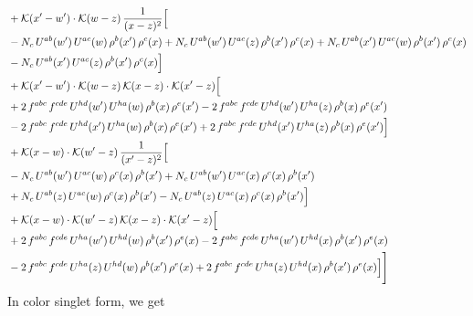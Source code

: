 \documentclass[9pt]{article}
\numberwithin{equation}{section}
\begin{document}
\begin{align}
& +\mathcal{K}(x'-w')\cdot\mathcal{K}(w-z)\,\frac{1}{(x-z)^{2}}\Big[\notag\\
& -N_{c}\,U^{ab}(w')\,U^{ac}(w)\,\rho^{b}(x')\,\rho^{c}(x) +N_{c}\,U^{ab}(w')\,U^{ac}(z)\,\rho^{b}(x')\,\rho^{c}(x) +N_{c}\,U^{ab}(x')\,U^{ac}(w)\,\rho^{b}(x')\,\rho^{c}(x)\notag\\
& -N_{c}\,U^{ab}(x')\,U^{ac}(z)\,\rho^{b}(x')\,\rho^{c}(x)\Big]\notag\\
& +\mathcal{K}(x'-w')\cdot\mathcal{K}(w-z)\,\mathcal{K}(x-z)\cdot\mathcal{K}(x'-z)\Big[\notag\\
& +2\,f^{abc}\,f^{cde}\,U^{hd}(w')\,U^{ha}(w)\,\rho^{b}(x)\,\rho^{e}(x') -2\,f^{abc}\,f^{cde}\,U^{hd}(w')\,U^{ha}(z)\,\rho^{b}(x)\,\rho^{e}(x')\notag\\
& -2\,f^{abc}\,f^{cde}\,U^{hd}(x')\,U^{ha}(w)\,\rho^{b}(x)\,\rho^{e}(x') +2\,f^{abc}\,f^{cde}\,U^{hd}(x')\,U^{ha}(z)\,\rho^{b}(x)\,\rho^{e}(x')\Big]\notag\\
& +\mathcal{K}(x-w)\cdot\mathcal{K}(w'-z)\,\frac{1}{(x'-z)^{2}}\Big[\notag\\
& -N_{c}\,U^{ab}(w')\,U^{ac}(w)\,\rho^{c}(x)\,\rho^{b}(x') +N_{c}\,U^{ab}(w')\,U^{ac}(x)\,\rho^{c}(x)\,\rho^{b}(x')\notag\\
& +N_{c}\,U^{ab}(z)\,U^{ac}(w)\,\rho^{c}(x)\,\rho^{b}(x') -N_{c}\,U^{ab}(z)\,U^{ac}(x)\,\rho^{c}(x)\,\rho^{b}(x')\Big]\notag\\
& +\mathcal{K}(x-w)\cdot\mathcal{K}(w'-z)\,\mathcal{K}(x-z)\cdot\mathcal{K}(x'-z)\Big[\notag\\
& +2\,f^{abc}\,f^{cde}\,U^{ha}(w')\,U^{hd}(w)\,\rho^{b}(x')\,\rho^{e}(x) -2\,f^{abc}\,f^{cde}\,U^{ha}(w')\,U^{hd}(x)\,\rho^{b}(x')\,\rho^{e}(x)\notag\\
& -2\,f^{abc}\,f^{cde}\,U^{ha}(z)\,U^{hd}(w)\,\rho^{b}(x')\,\rho^{e}(x) +2\,f^{abc}\,f^{cde}\,U^{ha}(z)\,U^{hd}(x)\,\rho^{b}(x')\,\rho^{e}(x)\Big]\Bigg]
\end{align}
In color singlet form, we get
\end{document}
